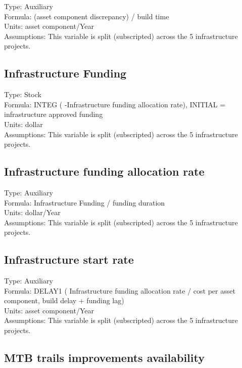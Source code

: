 \documentclass[
  11pt,
]{book}
\begin{document}
Type: Auxiliary\\
Formula: (asset component discrepancy) / build time\\
Units: asset component/Year\\
Assumptions: This variable is split (subscripted) across the 5 infrastructure projects.

\hypertarget{infrastructure-funding}{%
\subsection{Infrastructure Funding}\label{infrastructure-funding}}

Type: Stock\\
Formula: INTEG ( -Infrastructure funding allocation rate), INITIAL = infrastructure approved funding\\
Units: dollar\\
Assumptions: This variable is split (subscripted) across the 5 infrastructure projects.

\hypertarget{infrastructure-funding-allocation-rate}{%
\subsection{Infrastructure funding allocation rate}\label{infrastructure-funding-allocation-rate}}

Type: Auxiliary\\
Formula: Infrastructure Funding / funding duration\\
Units: dollar/Year\\
Assumptions: This variable is split (subscripted) across the 5 infrastructure projects.

\hypertarget{infrastructure-start-rate}{%
\subsection{Infrastructure start rate}\label{infrastructure-start-rate}}

Type: Auxiliary\\
Formula: DELAY1 ( Infrastructure funding allocation rate / cost per asset component, build delay + funding lag)\\
Units: asset component/Year\\
Assumptions: This variable is split (subscripted) across the 5 infrastructure projects.

\hypertarget{mtb-trails-improvements-availability}{%
\subsection{MTB trails improvements availability}\label{mtb-trails-improvements-availability}}
\end{document}
